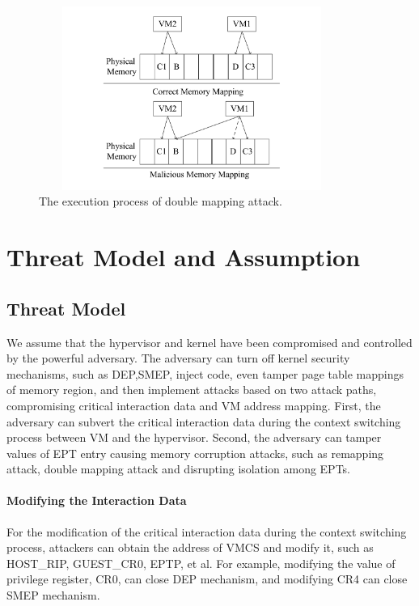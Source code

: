 ﻿\documentclass[conference]{IEEEtran}
\begin{document}
\begin{figure}
\centerline{\includegraphics[width=10cm, height=6cm]{pdfvmcs_lkl.pdf}}%
\caption{The execution process of double mapping attack. } \label{fig0}
\end{figure}

\section{Threat Model and Assumption}\label{sec:threat}


\subsection{Threat Model} \label {threat}



We assume that the hypervisor and kernel have been compromised and controlled by the powerful adversary. 
The adversary can turn off kernel security mechanisms, such as DEP,SMEP, inject code, even tamper page table mappings of memory region, and then implement attacks based on two attack paths, compromising critical interaction data and VM address mapping.
First, the adversary can subvert the critical interaction data during the context switching process between VM and the hypervisor. Second, the adversary can tamper values of EPT entry causing memory corruption attacks, such as remapping attack, double mapping attack and disrupting isolation among EPTs.

\paragraph{Modifying the Interaction Data}
For the modification of the critical interaction data during the context switching process, attackers can obtain the address of VMCS
and modify it, such as HOST\_RIP, GUEST\_CR0, EPTP, et al. For example,
modifying the value of privilege register, CR0, can close DEP mechanism, and modifying CR4 can close SMEP mechanism.
\end{document}
